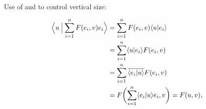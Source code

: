Use of  and  to control vertical size:

\newcommand\ip[2]{\langle #1 \/ | #2 \/\rangle}
\newcommand\Ip[2]{\left\langle{\arraycolsep=0pt %
\begin{array}{c|c}#1\/\,&\,#2\/\end{array}}%
\right\rangle}
\newcommand\Ipd[2]{\left\langle{\arraycolsep=0pt %
\begin{array}{c|c}\displaystyle#1\/\,&\,\displaystyle#2\/\end{array}}%
\right\rangle}
\newcommand\conj[1]{\overline{#1}}
\begin{align*}
\Ipd{ u\: }{\: \smash{\sum_{i=1}^n F(e_i,v) e_i }\vphantom{\sum}}
&= \sum_{i=1}^n F(e_i,v) \ip{ u }{ e_i } \\
&= \sum_{i=1}^n \ip{ u }{ e_i } F(e_i,v) \\
&= \sum_{i=1}^n \conj{\ip{ e_i }{ u }} F(e_i,v) \\
&= F \biggl( \sum_{i=1}^n \ip{ e_i }{ u } e_i,v\biggr) = F( u, v
),
\end{align*}